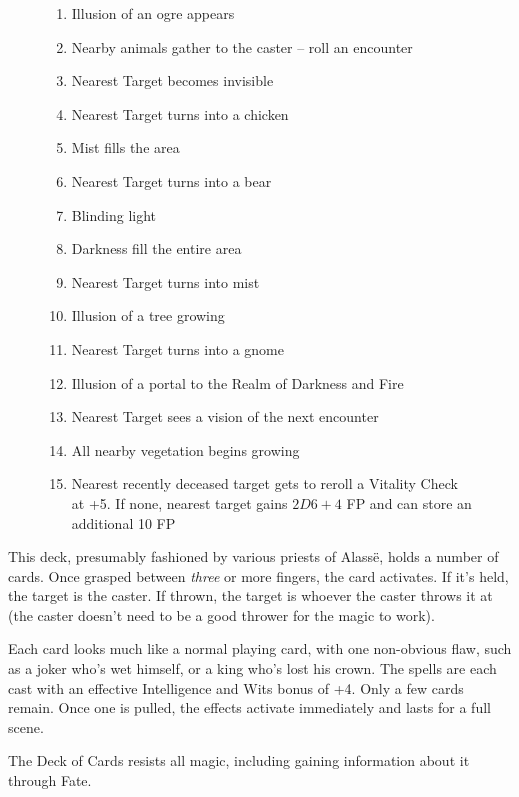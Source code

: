 \begin{multicols}{2}
\begin{figure*}[t!]
\begin{tcolorbox}
	\begin{enumerate}
		\item{Illusion of an ogre appears}
		\item{Nearby animals gather to the caster -- roll an encounter}
		\item{Nearest Target becomes invisible}
		\item{Nearest Target turns into a chicken}
		\item{Mist fills the area}
		\item{Nearest Target turns into a bear}
		\item{Blinding light}
		\item{Darkness fill the entire area}
		\item{Nearest Target turns into mist}
		\item{Illusion of a tree growing}
		\item{Nearest Target turns into a gnome}
		\item{Illusion of a portal to the Realm of Darkness and Fire}
		\item{Nearest Target sees a vision of the next encounter}
		\item{All nearby vegetation begins growing}
		\item{Nearest recently deceased target gets to reroll a Vitality Check at +5.  If none, nearest target gains $2D6+4$ FP and can store an additional 10 FP}
	\end{enumerate}
\end{tcolorbox}
\end{figure*}

This deck, presumably fashioned by various priests of Alass\"{e}, holds a number of cards.
Once grasped between \emph{three} or more fingers, the card activates.
If it's held, the target is the caster.
If thrown, the target is whoever the caster throws it at (the caster doesn't need to be a good thrower for the magic to work).

Each card looks much like a normal playing card, with one non-obvious flaw, such as a joker who's wet himself, or a king who's lost his crown.  The spells are each cast with an effective Intelligence and Wits bonus of +4.  Only a few cards remain.  Once one is pulled, the effects activate immediately and lasts for a full scene.

The Deck of Cards resists all magic, including gaining information about it through Fate.


\end{multicols}
